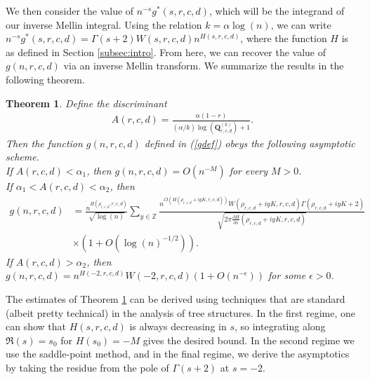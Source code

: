 \documentclass[proceedings]{aofa}
\newtheorem{theorem}{Theorem}
\newcommand{\Qk}{\textbf{Q}_{r,c,d}^{(k)}}
\newcommand{\gs}{g^{*}}
\begin{document}
We then consider the value of $n^{-s}\gs(s,r,c,d)$, which will be the integrand of our inverse Mellin integral. Using the relation $k=\alpha\log(n)$, we can write
$n^{-s}\gs(s,r,c,d)=\Gamma(s+2)W(s,r,c,d)n^{H(s,r,c,d)}$,
where the function $H$ is as defined in Section \ref{subsec:intro}.
From here, we can recover the value of $g(n,r,c,d)$ via an inverse Mellin transform. We summarize the results in the following theorem.
\begin{theorem}\label{hasymptote}
Define the discriminant
\begin{align*}
A(r,c,d)=\frac{\alpha(1-r)}{(\alpha/k)\log(\Qk)+1}.
\end{align*}
Then the function $g(n,r,c,d)$ defined in (\ref{gdef}) obeys the following asymptotic scheme. \\
If $A(r,c,d) < \alpha_{1}$, then $g(n,r,c,d)=O(n^{-M})$ for every $M>0$.\\
If $\alpha_{1} < A(r,c,d) < \alpha_{2}$, then
\begin{align*}
g(n,r,c,d) &= \frac{n^{H(\rho_{r,c,d},r,c,d)}}{\sqrt{\log(n)}}\sum_{y \in \mathbb{Z}}\frac{n^{i \Im(H(\rho_{r,c,d}+iyK,r,c,d))}W(\rho_{r,c,d}+iyK,r,c,d)\Gamma(\rho_{r,c,d}+iyK+2)}{\sqrt{2\pi \frac{\partial H}{\partial s}(\rho_{r,c,d}+iyK,r,c,d)}}\\
&\times (1+O(\log(n)^{-1/2})).
\end{align*}
If $A(r,c,d) > \alpha_{2}$, then 
$g(n,r,c,d)=n^{H(-2,r,c,d)}W(-2,r,c,d)(1+O(n^{-\epsilon}))$
for some $\epsilon>0$.
\end{theorem}
The estimates of Theorem \ref{hasymptote} can be derived using techniques that are standard (albeit pretty technical) in the analysis of tree structures. In the first regime, one can show that $H(s,r,c,d)$ is always decreasing in $s$, so integrating along $\Re(s)=s_{0}$ for $H(s_{0})=-M$ gives the desired bound. In the second regime we use the saddle-point method, and in the final regime, we derive the asymptotics by taking the residue from the pole of $\Gamma(s+2)$ at $s=-2$. 
\end{document}
